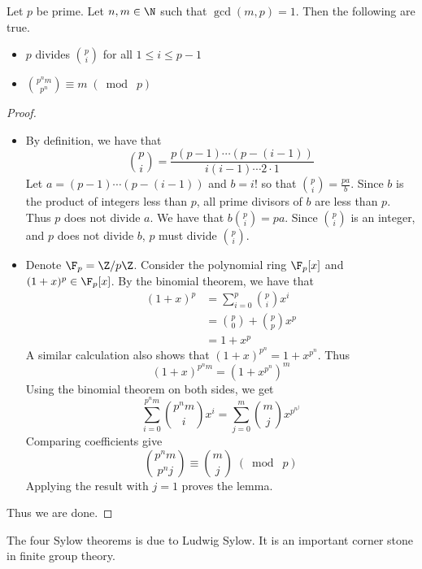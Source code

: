 \documentclass[a4paper]{article}
\begin{document}
\begin{lmm}{}{} Let $p$ be prime. Let $n,m\in\N$ such that $\gcd(m,p)=1$. Then the following are true. 
\begin{itemize}
\item $p$ divides $\binom{p}{i}$ for all $1\leq i\leq p-1$
\item $\binom{p^nm}{p^n}\equiv m\;(\bmod\;p)$
\end{itemize} 
\begin{proof}~\\
\begin{itemize}
\item By definition, we have that $$\binom{p}{i}=\frac{p(p-1)\cdots(p-(i-1))}{i(i-1)\cdots2\cdot 1}$$ Let $a=(p-1)\cdots(p-(i-1))$ and $b=i!$ so that $\binom{p}{i}=\frac{pa}{b}$. Since $b$ is the product of integers less than $p$, all prime divisors of $b$ are less than $p$. Thus $p$ does not divide $a$. We have that $b\binom{p}{i}=pa$. Since $\binom{p}{i}$ is an integer, and $p$ does not divide $b$, $p$ must divide $\binom{p}{i}$. 
\item Denote $\F_p=\Z/p\Z$. Consider the polynomial ring $\F_p[x]$ and $(1+x)^p\in\F_p[x]$. By the binomial theorem, we have that 
\begin{align*}
(1+x)^p&=\sum_{i=0}^p\binom{p}{i}x^i\\
&=\binom{p}{0}+\binom{p}{p}x^p\\
&=1+x^p
\end{align*}
A similar calculation also shows that $(1+x)^{p^n}=1+x^{p^n}$. Thus $$(1+x)^{p^nm}=(1+x^{p^n})^m$$ Using the binomial theorem on both sides, we get $$\sum_{i=0}^{p^nm}\binom{p^nm}{i}x^i=\sum_{j=0}^m\binom{m}{j}x^{p^{n^j}}$$ Comparing coefficients give $$\binom{p^nm}{p^nj}\equiv\binom{m}{j}\;(\bmod\;p)$$ Applying the result with $j=1$ proves the lemma. 
\end{itemize}
Thus we are done. 
\end{proof}
\end{lmm}

The four Sylow theorems is due to Ludwig Sylow. It is an important corner stone in finite group theory. 
\end{document}
